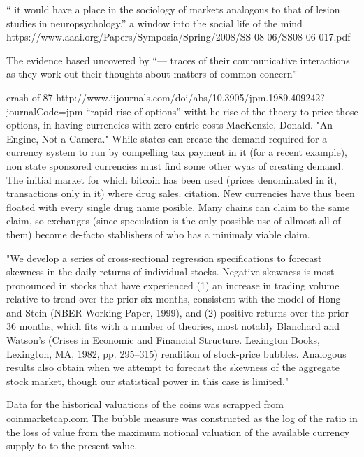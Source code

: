 “ it would have a place in the sociology of markets analogous to that of lesion studies in neuropsychology.” a window into the social life of the mind https://www.aaai.org/Papers/Symposia/Spring/2008/SS-08-06/SS08-06-017.pdf

The evidence based uncovered by “— traces of their communicative interactions as they work out their thoughts about matters of common concern” 

crash of 87 http://www.iijournals.com/doi/abs/10.3905/jpm.1989.409242?journalCode=jpm “rapid rise of options” witht he rise of the thoery to price those options, in having currencies with zero entrie costs
MacKenzie, Donald. "An Engine, Not a Camera."
While states can create the demand required for a currency system to run by compelling tax payment in it (for a recent example), non state sponsored currencies must find some other wyas of creating demand.
The initial market for which bitcoin has been used (prices denominated in it, transactions only in it) where drug sales. citation.
New currencies have thus been floated with every single drug name posible. Many chains can claim to the same claim, so exchanges (since speculation is the only possible use of allmost all of them) become de-facto stablishers of who has a minimaly viable claim. 


"We develop a series of cross-sectional regression specifications to forecast skewness in the daily returns of individual stocks. Negative skewness is most pronounced in stocks that have experienced (1) an increase in trading volume relative to trend over the prior six months, consistent with the model of Hong and Stein (NBER Working Paper, 1999), and (2) positive returns over the prior 36 months, which fits with a number of theories, most notably Blanchard and Watson's (Crises in Economic and Financial Structure. Lexington Books, Lexington, MA, 1982, pp. 295–315) rendition of stock-price bubbles. Analogous results also obtain when we attempt to forecast the skewness of the aggregate stock market, though our statistical power in this case is limited."






Data for the historical valuations of the coins was scrapped from coinmarketcap.com The bubble measure was constructed as the log of the ratio in the loss of value from the maximum notional valuation of the available currency supply to to the present value. 

